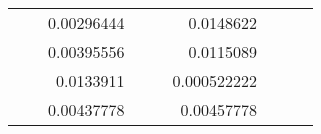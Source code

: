 \begin{table}[H]
\begin{tabular}{|ccrccrccc}
\multicolumn{1}{|c|}{\cellcolor[HTML]{FFFFC7}}                                & \multicolumn{1}{c|}{\cellcolor[HTML]{DAE8FC}}                      & \multicolumn{1}{r|}{\cellcolor[HTML]{DAE8FC}0.00296444}  & \multicolumn{1}{c|}{\cellcolor[HTML]{FFFFC7}}                                & \multicolumn{1}{c|}{\cellcolor[HTML]{DAE8FC}}                       & \multicolumn{1}{r|}{\cellcolor[HTML]{DDFDFF}0.0148622}   &                                                                              &                                                                    &                                                          \\ \cline{3-3} \cline{6-6}
\multicolumn{1}{|c|}{\cellcolor[HTML]{FFFFC7}}                                & \multicolumn{1}{c|}{\cellcolor[HTML]{DAE8FC}}                      & \multicolumn{1}{r|}{\cellcolor[HTML]{DDFDFF}0.00395556}  & \multicolumn{1}{c|}{\cellcolor[HTML]{FFFFC7}}                                & \multicolumn{1}{c|}{\cellcolor[HTML]{DAE8FC}}                       & \multicolumn{1}{r|}{\cellcolor[HTML]{DAE8FC}0.0115089}   &                                                                              &                                                                    &                                                          \\ \cline{3-3} \cline{6-6}
\multicolumn{1}{|c|}{\cellcolor[HTML]{FFFFC7}}                                & \multicolumn{1}{c|}{\cellcolor[HTML]{DAE8FC}}                      & \multicolumn{1}{r|}{\cellcolor[HTML]{DAE8FC}0.0133911}   & \multicolumn{1}{c|}{\cellcolor[HTML]{FFFFC7}}                                & \multicolumn{1}{c|}{\cellcolor[HTML]{DAE8FC}}                       & \multicolumn{1}{r|}{\cellcolor[HTML]{DDFDFF}0.000522222} &                                                                              &                                                                    &                                                          \\ \cline{3-3} \cline{6-6}
\multicolumn{1}{|c|}{\cellcolor[HTML]{FFFFC7}}                                & \multicolumn{1}{c|}{\cellcolor[HTML]{DAE8FC}}                      & \multicolumn{1}{r|}{\cellcolor[HTML]{DDFDFF}0.00437778}  & \multicolumn{1}{c|}{\cellcolor[HTML]{FFFFC7}}                                & \multicolumn{1}{c|}{\cellcolor[HTML]{DAE8FC}}                       & \multicolumn{1}{r|}{\cellcolor[HTML]{DAE8FC}0.00457778}  &                                                                              &                                                                    &                                                          \\ \cline{3-3} \cline{6-6}

\end{tabular}
\end{table}
